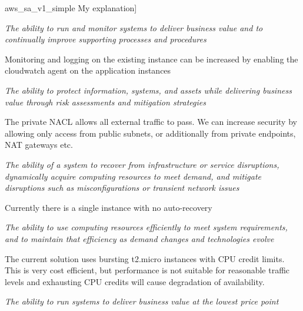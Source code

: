 
\imagefigsingle
{aws_sa_v1_simple}
{My explanation]}


\textit{The ability to run and monitor systems to deliver business value and to continually improve supporting processes and procedures}


Monitoring and logging on the existing instance can be increased by enabling the cloudwatch agent on the application instances



\textit{The ability to protect information, systems, and assets while delivering business value through risk assessments and mitigation strategies}





The private NACL allows all external traffic to pass. We can increase security by allowing only access from public subnets, or additionally from private endpoints, NAT gateways etc.


\textit{The ability of a system to recover from infrastructure or service disruptions, dynamically acquire computing resources to meet demand, and mitigate disruptions such as misconfigurations or transient network issues}

Currently there is a single instance with no auto-recovery




\textit{The ability to use computing resources efficiently
	to meet system requirements, and to maintain that efficiency as demand changes and technologies evolve}


The current solution uses bursting t2.micro instances with CPU credit limits. This is very cost efficient, but performance is not suitable for reasonable traffic levels and exhausting CPU credits will cause degradation of availability.


\textit{The ability to run systems to deliver business value at the lowest price point}





